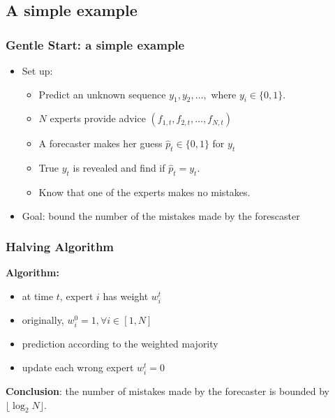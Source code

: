\documentclass{beamer}
\begin{document}
\subsection{A simple example}
\begin{frame}
\frametitle{Gentle Start: a simple example}
\begin{itemize}
\item Set up:
\begin{itemize}
\item Predict an unknown sequence $y_1, y_2, \ldots,$ where $y_i\in\{0,1\}.$
\pause
\item $N$ experts provide advice $(f_{1,t},f_{2,t},\ldots, f_{N,t})$
\pause
\item A forecaster makes her guess $\hat{p}_t\in\{0,1\}$ for $y_t$ 
\pause
\item True $y_t$ is revealed and find if $\hat{p}_t = y_t$. 
\pause
\item Know that one of the experts makes no mistakes.
\pause
\end{itemize}
\item Goal: bound the number of the mistakes made by the forescaster
\end{itemize}
\end{frame}

\begin{frame}
\frametitle{Halving Algorithm}
{\bf Algorithm:}
\begin{itemize}
\item at time $t$, expert $i$ has weight $w_i^t$
\pause
\item originally, $w_i^0 = 1, \forall i\in[1,N]$
\pause
\item prediction according to the weighted majority 
\pause
\item update each wrong expert   $w_i^t = 0$
\pause
\end{itemize}
{\bf Conclusion}: the number of mistakes made by the forecaster is bounded by {\color{red}$\lfloor\log_2 N\rfloor$}.
\end{frame}
\end{document}

